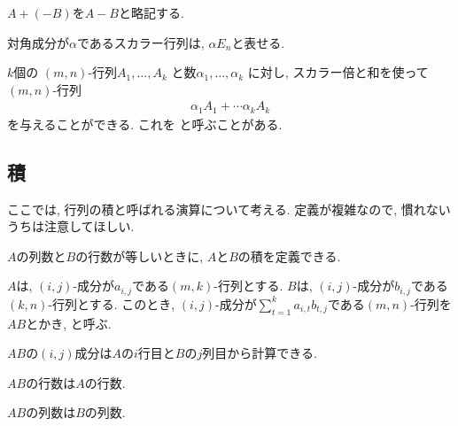 \begin{definition}
  $A+(-B)$を$A-B$と略記する.
\end{definition}

\begin{remark}
  対角成分が$\alpha$であるスカラー行列は, $\alpha E_n$と表せる.
\end{remark}

\begin{remark}
  $k$個の
  $(m,n)$-行列$A_1,\ldots,A_k$
  と数$\alpha_1,\ldots,\alpha_k$
  に対し, スカラー倍と和を使って
  $(m,n)$-行列
  \begin{align*}
    \alpha_1A_1 + \cdots \alpha_kA_k
  \end{align*}
  を与えることができる.
  これを
 と呼ぶことがある.
\end{remark}

\subsection{積}
ここでは, 行列の積と呼ばれる演算について考える.
定義が複雑なので,
慣れないうちは注意してほしい.


$A$の列数と$B$の行数が等しいときに,
$A$と$B$の積を定義できる.
\begin{definition}
  \label{def:op:prod}
  $A$は, $(i,j)$-成分が$a_{i,j}$である$(m,k)$-行列とする.
  $B$は, $(i,j)$-成分が$b_{i,j}$である$(k,n)$-行列とする.
  このとき,
  $(i,j)$-成分が$\sum_{t=1}^{k}a_{i,t}b_{t,j}$である$(m,n)$-行列を$AB$とかき,
  と呼ぶ. 
\end{definition}
\begin{remark}
  $AB$の$(i,j)$成分は$A$の$i$行目と$B$の$j$列目から計算できる.
\end{remark}
\begin{remark}
  $AB$の行数は$A$の行数.
\end{remark}
\begin{remark}
  $AB$の列数は$B$の列数.
\end{remark}



